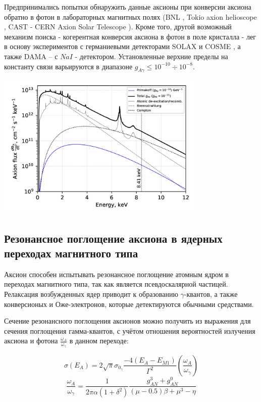 \documentclass[a4paper,article,14pt]{extarticle}
\begin{document}
Предпринимались попытки обнаружить данные аксионы при конверсии аксиона обратно в фотон в лабораторных магнитных полях (BNL \cite{lazarus1992search}, Tokio axion helioscope \cite{moriyama1998direct,inoue2002search}, CAST - CERN Axion Solar Telescope \cite{beltran2005search}). Кроме того, другой возможный механизм поиска - когерентная конверсия аксиона в фотон в поле кристалла \cite{paschos1994proposal} - лег в основу экспериментов с германиевыми детекторами SOLAX \cite{avignone1998first, avignone1999solar} и COSME \cite{scopel1998theoretical, morales2002particle}, а также DAMA \cite{bernabei2001search} -- с $NaI$ - детектором. Установленные верхние пределы на константу связи варьируются в диапазоне $g_{A \gamma} \leqslant {10^{ - 10}} \div {10^{ - 8}}$.

\includegraphics[width = 0.75\textwidth]{images/flux_solar.png}

\subsection{Резонансное поглощение аксиона в ядерных переходах магнитного типа}

Аксион способен испытывать резонансное поглощение атомным ядром в переходах магнитного типа, так как является псевдоскалярной частицей. Релаксация возбужденных ядер приводит к образованию $\gamma$-квантов, а также конверсионых и Оже-электронов, которые детектируются обычными средствами.

Сечение резонансного поглощения аксионов можно получить из выражения для сечения поглощения гамма-квантов, с учётом отношения вероятностей излучения аксиона и фотона $\frac{\omega_A}{\omega _{\gamma}}$ в данном переходе:

\begin{equation}
    \sigma \left( {{E_A}} \right) = 2\sqrt \pi  {\sigma _{{0_\gamma }}}\frac{{ - 4\left( {{E_A} - {E_{M1}}} \right)}}{{{\Gamma ^2}}}\left( {\frac{{{\omega _A}}}{{{\omega _\gamma }}}} \right)
\end{equation}
\begin{equation}
    \frac{{{\omega _A}}}{{{\omega _\gamma }}} = \frac{1}{{2\pi \alpha \left( {1 + {\delta ^2}} \right)}}\frac{{g_{AN}^3 + g_{AN}^0}}{{\left( {\mu  - 0.5} \right)\beta  + {\mu ^3} - \eta }}
\end{equation}
\end{document}
